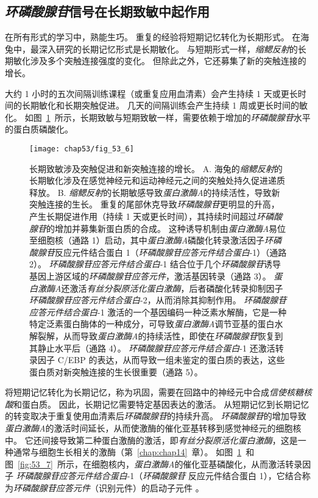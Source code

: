 \subsection{\textit{环磷酸腺苷}信号在长期致敏中起作用}

在所有形式的学习中，熟能生巧。
重复的经验将短期记忆转化为长期形式。
在海兔中，最深入研究的长期记忆形式是长期敏化。
与短期形式一样，\textit{缩鳃反射}的长期敏化涉及多个突触连接强度的变化。
但除此之外，它还募集了新的突触连接的增长。


大约 1 小时的五次间隔训练课程（或重复应用血清素）会产生持续 1 天或更长时间的长期敏化和长期突触促进。
几天的间隔训练会产生持续 1 周或更长时间的敏化。
如图~\ref{fig:53_6}~所示，长期致敏与短期致敏一样，需要依赖于增加的\textit{环磷酸腺苷}水平的蛋白质磷酸化。


\begin{figure}[htbp]
	\centering
	\texttt{[image: chap53/fig\_53\_6]}
	\caption{长期致敏涉及突触促进和新突触连接的增长。
		A. 海兔的\textit{缩鳃反射}的长期敏化涉及在感觉神经元和运动神经元之间的突触处持久促进递质释放。
		B. \textit{缩鳃反射}的长期敏感导致\textit{蛋白激酶A}的持续活性，导致新突触连接的生长。
		重复的尾部休克导致\textit{环磷酸腺苷}更明显的升高，产生长期促进作用（持续 1 天或更长时间），其持续时间超过\textit{环磷酸腺苷}的增加并募集新蛋白质的合成。
		这种诱导机制由\textit{蛋白激酶A}易位至细胞核（通路 1）启动，其中\textit{蛋白激酶A}磷酸化转录激活因子\textit{环磷酸腺苷}反应元件结合蛋白 1（\textit{环磷酸腺苷应答元件结合蛋白}-1）（通路 2）。
		\textit{环磷酸腺苷应答元件结合蛋白}-1 结合位于几个\textit{环磷酸腺苷}诱导基因上游区域的\textit{环磷酸腺苷应答元件}，激活基因转录（通路 3）。
		\textit{蛋白激酶A}还激活\textit{有丝分裂原活化蛋白激酶}，后者磷酸化转录抑制因子\textit{环磷酸腺苷应答元件结合蛋白}-2，从而消除其抑制作用。
		\textit{环磷酸腺苷应答元件结合蛋白}-1 激活的一个基因编码一种泛素水解酶，它是一种特定泛素蛋白酶体的一种成分，可导致\textit{蛋白激酶A}调节亚基的蛋白水解裂解，从而导致\textit{蛋白激酶A}的持续活性，即使在\textit{环磷酸腺苷}恢复到其静止水平后（通路 4）。
		\textit{环磷酸腺苷应答元件结合蛋白}-1 还激活转录因子 C/EBP 的表达，从而导致一组未鉴定的蛋白质的表达，这些蛋白质对新突触连接的生长很重要（通路 5）。}
	\label{fig:53_6}
\end{figure}


将短期记忆转化为长期记忆，称为巩固，需要在回路中的神经元中合成\textit{信使核糖核酸}和蛋白质。
因此，长期记忆需要特定基因表达的激活。
从短期记忆到长期记忆的转变取决于重复使用血清素后\textit{环磷酸腺苷}的持续升高。
\textit{环磷酸腺苷}的增加导致\textit{蛋白激酶A}的激活时间延长，从而使激酶的催化亚基转移到感觉神经元的细胞核中。
它还间接导致第二种蛋白激酶的激活，即\textit{有丝分裂原活化蛋白激酶}，这是一种通常与细胞生长相关的激酶（第~\ref{chap:chap14}~章）。
如图~\ref{fig:53_6}~和图~\ref{fig:53_7}~所示，在细胞核内，\textit{蛋白激酶A}的催化亚基磷酸化，从而激活转录因子 \textit{环磷酸腺苷应答元件结合蛋白}-1（\textit{环磷酸腺苷} 反应元件结合蛋白 1），它结合称为\textit{环磷酸腺苷应答元件}（识别元件）的启动子元件 。



